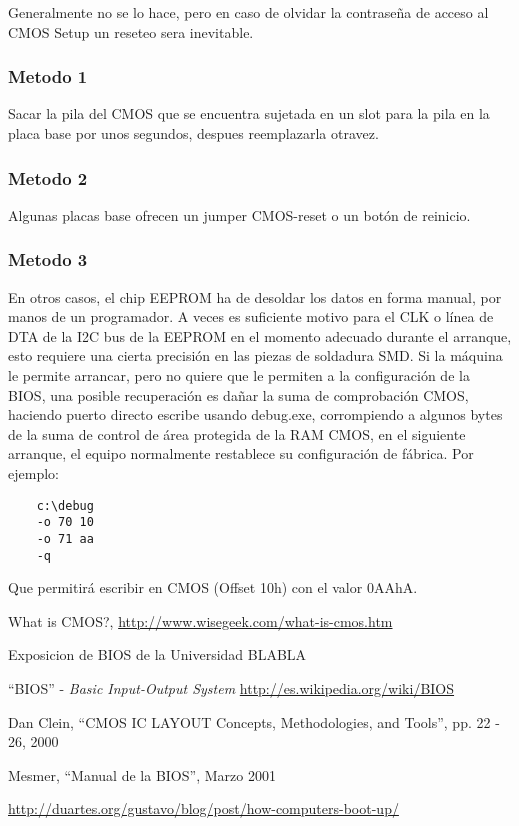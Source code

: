 \documentclass[12pt,oneside,a4paper]{article}
\begin{document}
	Generalmente no se lo hace, pero en caso de olvidar la contraseña de acceso al CMOS Setup un reseteo sera inevitable.

	\subsubsection{Metodo 1}{\label{sec:metodo 1}}

	Sacar la pila del CMOS que se encuentra sujetada en un slot para la pila en
	la placa base por unos segundos, despues reemplazarla otravez.

	\subsubsection{Metodo 2}{\label{sec:metodo 2}}

	Algunas placas base ofrecen un jumper CMOS-reset o un botón de reinicio.



	\subsubsection{Metodo 3}{\label{sec:metodo 3}}

	En otros casos, el chip EEPROM ha de desoldar los datos en forma manual,
	por manos de un programador. A veces es suficiente motivo para el CLK o
	línea de DTA de la I2C bus de la EEPROM en el momento adecuado durante el
	arranque, esto requiere una cierta precisión en las piezas de soldadura
	SMD. Si la máquina le permite arrancar, pero no quiere que le permiten a la
	configuración de la BIOS, una posible recuperación es dañar la suma de
	comprobación CMOS, haciendo puerto directo escribe usando debug.exe,
	corrompiendo a algunos bytes de la suma de control de área protegida de la
	RAM CMOS, en el siguiente arranque, el equipo normalmente restablece su
	configuración de fábrica. Por ejemplo:

	\begin{verbatim}
	c:\debug
	-o 70 10
	-o 71 aa
	-q
	\end{verbatim}

	Que permitirá escribir en CMOS (Offset 10h) con el valor 0AAhA.

	\newpage

\begin{thebibliography}{9}{\label{sec:bibliografia}}

		What is CMOS?,
		\url{http://www.wisegeek.com/what-is-cmos.htm}

		Exposicion de BIOS de la Universidad BLABLA

		``BIOS'' - {\em Basic Input-Output System}
		\url{http://es.wikipedia.org/wiki/BIOS}

		Dan Clein, ``CMOS IC LAYOUT Concepts, Methodologies, and Tools'', pp. 22 - 26, 2000

		Mesmer, ``Manual de la BIOS'', Marzo 2001
	
		\url{http://duartes.org/gustavo/blog/post/how-computers-boot-up/}

\end{thebibliography}
\end{document}
